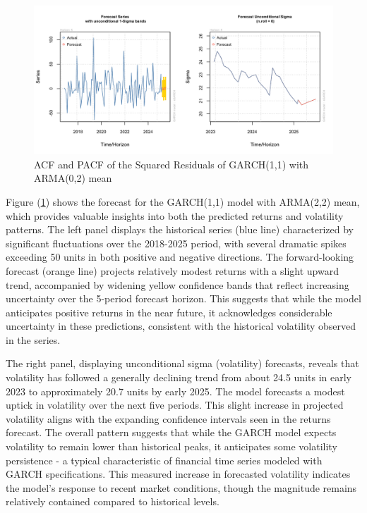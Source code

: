 \begin{figure}[!h]
	\centering
	\includegraphics[width=0.85\linewidth]{content/plots/GARCH_forecast.png}
	\caption{ACF and PACF of the Squared Residuals of GARCH(1,1) with ARMA(0,2) mean}
	\label{fig:GARCH_forecast}
\end{figure}

Figure (\ref{fig:GARCH_forecast}) shows the forecast for the GARCH(1,1) model with ARMA(2,2) mean, which provides valuable insights into both the predicted returns and volatility patterns. The left panel displays the historical series (blue line) characterized by significant fluctuations over the 2018-2025 period, with several dramatic spikes exceeding 50 units in both positive and negative directions. The forward-looking forecast (orange line) projects relatively modest returns with a slight upward trend, accompanied by widening yellow confidence bands that reflect increasing uncertainty over the 5-period forecast horizon. This suggests that while the model anticipates positive returns in the near future, it acknowledges considerable uncertainty in these predictions, consistent with the historical volatility observed in the series.


The right panel, displaying unconditional sigma (volatility) forecasts, reveals that volatility has followed a generally declining trend from about 24.5 units in early 2023 to approximately 20.7 units by early 2025. The model forecasts a modest uptick in volatility over the next five periods. This slight increase in projected volatility aligns with the expanding confidence intervals seen in the returns forecast. The overall pattern suggests that while the GARCH model expects volatility to remain lower than historical peaks, it anticipates some volatility persistence - a typical characteristic of financial time series modeled with GARCH specifications. This measured increase in forecasted volatility indicates the model’s response to recent market conditions, though the magnitude remains relatively contained compared to historical levels.

